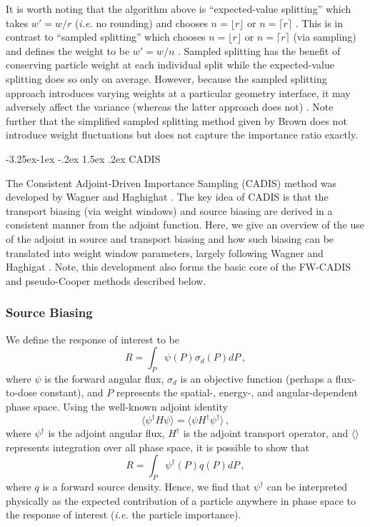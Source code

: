 \documentclass[letter,11pt]{article}
\makeatletter
\renewcommand\subsection{\@startsection{subsection}{2}{\z@}%
                                {-3.25ex\@plus -1ex \@minus -.2ex}%
                                {1.5ex \@plus .2ex}%
                                {\normalfont\itshape\bf}}
\newcommand{\ie}{{\it i.e. }}
\makeatother
\begin{document}
It is worth noting that the algorithm above is  ``expected-value splitting'' which takes $ w' = w/r$ (\ie no rounding) and  chooses $n = \lfloor r \rfloor $ or $ n= \lceil r \rceil$ \cite{booth1985mcv}.  This is in contrast to ``sampled splitting'' which chooses  $n = \lfloor r \rfloor$ or $ n = \lceil r \rceil$ (via sampling) and  defines the weight to be $w'=w/n$ \cite{booth1985mcv}.   Sampled splitting has the benefit of conserving particle weight at each individual split while the expected-value splitting does so only on average.  However, because the sampled splitting approach introduces varying weights at a particular geometry interface, it may adversely affect the variance (whereas the latter approach does not) \cite{haghighat2003mcv}.  Note further that the simplified sampled splitting method given by Brown \cite{brown2005fmc} does not introduce weight fluctuations but does not capture the importance ratio exactly.

\subsection{CADIS}

The Consistent Adjoint-Driven Importance Sampling (CADIS) method was developed by Wagner and Haghighat \cite{wagner1998avr}.  The key idea of CADIS is that the transport biasing (via weight windows) and source biasing are derived in a consistent manner from the adjoint function.  Here, we give an overview of the use of the adjoint in source and transport biasing and how such biasing can be translated into weight window parameters, largely following Wagner and Haghigat \cite{wagner1998avr}.  Note, this development also forms the basic core of the FW-CADIS and pseudo-Cooper methods described below.

\subsubsection{Source Biasing}

We define the response of interest to be
\begin{equation}
 R = \int_P \psi (P) \sigma_d(P)dP \, ,
\end{equation}
where $\psi$ is the forward angular flux, $\sigma_d$ is an objective function (perhaps a flux-to-dose constant), and $P$ represents the spatial-, energy-, and angular-dependent phase space.  Using the well-known adjoint identity
\begin{equation}
 \langle \psi^\dag H \psi \rangle = \langle \psi H^\dag \psi^\dag \rangle \, ,
\end{equation}
where $\psi^\dag$ is the adjoint angular flux, $H^\dag$ is the adjoint transport operator, and  $\langle \rangle$ represents integration over all phase space, it is possible to show that 
\begin{equation}
 R = \int_P \psi^\dag (P) q(P)dP \, ,
\end{equation}
where $q$ is a forward source density.  Hence, we find that $\psi^\dag$ can be interpreted physically as the expected contribution of a particle anywhere in phase space to the response of interest (\ie the particle importance).
\end{document}
